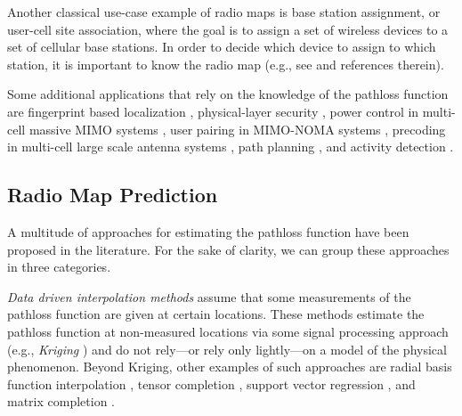 \documentclass[10pt,a4paper]{article}
\begin{document}
Another classical use-case example of radio maps is base station assignment, or user-cell site association, where the goal is to assign a set of wireless devices to a set of cellular base stations. In order to decide which device to assign to which station, it is important to know the radio map (e.g., see \cite{userCellAssoc} and references therein). 

Some additional applications that rely on the knowledge of the pathloss function are fingerprint based localization \cite{FingerLoc}, physical-layer security \cite{PLS}, power control in multi-cell massive MIMO systems \cite{PowerCellular}, user pairing in MIMO-NOMA systems \cite{PowerNOMA}, precoding in multi-cell large scale antenna systems \cite{LSAS}, path planning \cite{pathUAV}, and activity detection \cite{activDet}.



\subsection{Radio Map Prediction}

A multitude of approaches for estimating the pathloss function have been proposed in the literature. For the sake of clarity, we can group these approaches in three categories. 

\emph{Data driven interpolation methods} assume that some measurements of the pathloss function are given at certain locations. These methods estimate the pathloss function at non-measured locations via some signal processing approach (e.g., {\em Kriging} \cite{stein2012interpolation}) and do not rely---or rely only lightly---on a model of the physical phenomenon. Beyond Kriging, other examples of such approaches are radial basis function interpolation \cite[Sect 5.1]{BishopNNPR}, tensor completion \cite{TensorCompletion}, support vector regression \cite{SVR}, and matrix completion \cite{MatComp}.


\end{document}
